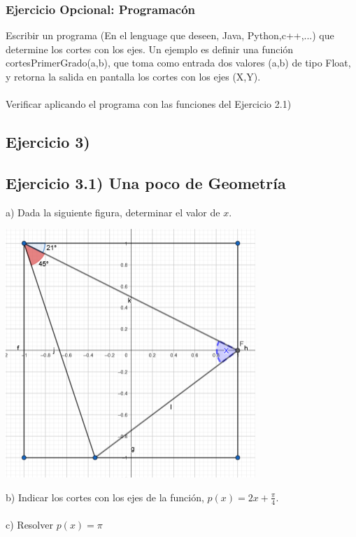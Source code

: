 \documentclass[11pt, a4paper]{article}
\begin{document}
\newpage

\subsubsection*{Ejercicio Opcional: Programac\'on}
Escribir un programa (En el lenguage que deseen, Java, Python,c++,...) que determine los cortes con los ejes. Un ejemplo es definir una funci\'on \\ {\color{blue}cortesPrimerGrado(a,b)}, que toma como entrada dos valores (a,b) de tipo Float, y retorna la salida en pantalla los cortes con los ejes (X,Y). \\ \\ 
Verificar aplicando el programa con las funciones del Ejercicio 2.1)

\subsection*{Ejercicio 3)  }
\subsection*{Ejercicio 3.1)  Una poco de Geometr\'ia }
a) Dada la siguiente figura, determinar el valor de $x$. 
\begin{center}
   \includegraphics[scale=1]{problemaGeoyFunciones.png}
\end{center}
b) Indicar los cortes con los ejes de la funci\'on, $\displaystyle p(x) = 2x + \frac{\pi}{4}$. \\ \\ c) Resolver $p(x) = \pi$ 

\newpage
\end{document}
